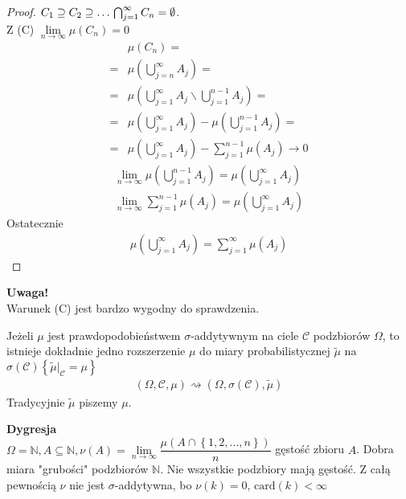 \begin{proof}
$ C_1\supseteq C_2\supseteq\dots \\
\bigcap_{j=1}^\infty C_n = \emptyset$.\\
Z (C) $ \lim\limits_{n\to\infty} \mu \left(C_n\right)=0 $
\begin{align*}
&\mu\left(C_n\right)
=\\=&
\mu \left(\bigcup_{j=n}^\infty A_j\right)
=\\=&
\mu\left(\bigcup_{j=1}^\infty A_j\backslash\bigcup_{j=1}^{n-1} A_j\right)
=\\=&
\mu\left(\bigcup_{j=1}^\infty A_j\right)-\mu\left(\bigcup_{j=1}^{n-1} A_j\right)
=\\=&
\mu\left(\bigcup_{j=1}^\infty A_j\right)-\sum_{j=1}^{n-1} \mu\left(A_j\right)\to0
\end{align*}
\begin{gather*}
\lim\limits_{n\to\infty} \mu\left(\bigcup_{j=1}^{n-1} A_j\right)=\mu\left(\bigcup_{j=1}^{\infty } A_j\right)\\
\lim\limits_{n\to\infty} \sum_{j=1}^{n-1} \mu\left(A_j\right)=\mu\left(\bigcup_{j=1}^{\infty } A_j\right)
\end{gather*}
Ostatecznie
\begin{gather*}
\mu\left(\bigcup_{j=1}^{\infty } A_j\right)=
\sum_{j=1}^{\infty } \mu\left(A_j\right)
\end{gather*}
\end{proof}
\textbf{Uwaga!}\\
Warunek (C) jest bardzo wygodny do sprawdzenia.
\begin{twr}
Jeżeli $ \mu $ jest prawdopodobieństwem $\sigma$-addytywnym na ciele $ \mathcal C $ podzbiorów $ \Omega $, to istnieje dokładnie jedno rozszerzenie $ \mu  $ do miary probabilistycznej $ \tilde{\mu} $ na $ \sigma\left(\mathcal C\right) \left\{\tilde{\mu}|_\mathcal C=\mu\right\}$
\begin{gather*}
\left(\Omega,\mathcal C,\mu\right)
\rightsquigarrow
\left(\Omega,\sigma\left(\mathcal C\right),\tilde{\mu}\right)
\end{gather*}
Tradycyjnie $ \tilde{\mu} $ piszemy $ \mu $.
\end{twr}
\textbf{Dygresja}\\
$ \Omega=\mathbb N ,A\subseteq \mathbb N ,\nu \left(A\right) =\lim\limits_{n\to\infty} \dfrac{\mu \left(A\cap\left\{1,2,\dots,n\right\}\right)}{n}$ gęstość zbioru $ A $.
Dobra miara "grubości" podzbiorów $ \mathbb N  $. Nie wszystkie podzbiory mają gęstość. Z całą pewnością $ \nu$ nie jest $\sigma$-addytywna, bo $ \nu(k)=0,\,\text{card}(k)<\infty $\\
